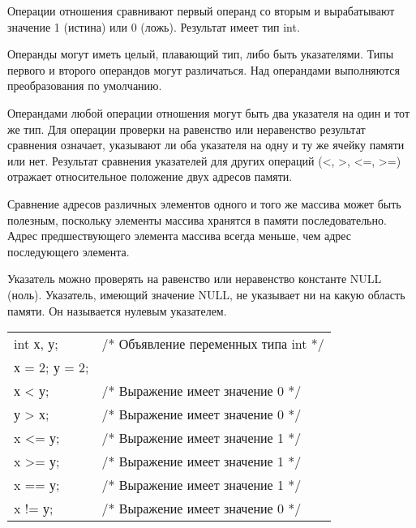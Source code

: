Операции отношения сравнивают первый операнд со вторым и вырабатывают значение 1 (истина) или 0 (ложь). Результат имеет тип int. \killoverfullbefore

Операнды могут иметь целый, плавающий тип, либо быть указателями. Типы первого и второго операндов могут различаться. Над операндами выполняются преобразования по умолчанию.\killoverfullbefore

Операндами любой операции отношения могут быть два указателя на один и тот же тип. Для операции проверки на равенство или неравенство результат сравнения означает, указывают ли оба указателя на одну и ту же ячейку памяти или нет. Результат сравнения указателей для других операций (<, >, <=, >=) отражает относительное положение двух адресов памяти.\killoverfullbefore

Сравнение адресов различных элементов одного и того же массива может быть полезным, поскольку элементы массива хранятся в памяти последовательно. Адрес предшествующего элемента массива всегда меньше, чем адрес последующего элемента.\killoverfullbefore

Указатель можно проверять на равенство или неравенство константе NULL (ноль). Указатель, имеющий значение NULL, не указывает ни на какую область памяти. Он называется нулевым указателем.\killoverfullbefore \BL

\begin{pExample}
\begin{tabular}{ l l }
int х, у; & \textcolor{exComm}{/* Объявление переменных типа int */} \\
х = 2; у = 2; & \textcolor{exComm}{ } \\
х < у; & \textcolor{exComm}{/* Выражение имеет значение 0 */} \\
у > х; & \textcolor{exComm}{/* Выражение имеет значение 0 */} \\
x <= у;  & \textcolor{exComm}{/* Выражение имеет значение 1 */} \\
x >= у;  & \textcolor{exComm}{/* Выражение имеет значение 1 */} \\
x == у;  & \textcolor{exComm}{/* Выражение имеет значение 1 */} \\
x != у;  & \textcolor{exComm}{/* Выражение имеет значение 0 */} \\  
\end{tabular}
\end{pExample}

